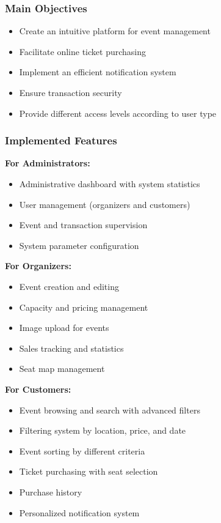 \documentclass[12pt,a4paper]{article}
\begin{document}
\subsubsection{Main Objectives}
\begin{itemize}
    \item Create an intuitive platform for event management
    \item Facilitate online ticket purchasing
    \item Implement an efficient notification system
    \item Ensure transaction security
    \item Provide different access levels according to user type
\end{itemize}

\subsubsection{Implemented Features}

\textbf{For Administrators:}
\begin{itemize}
    \item Administrative dashboard with system statistics
    \item User management (organizers and customers)
    \item Event and transaction supervision
    \item System parameter configuration
\end{itemize}

\textbf{For Organizers:}
\begin{itemize}
    \item Event creation and editing
    \item Capacity and pricing management
    \item Image upload for events
    \item Sales tracking and statistics
    \item Seat map management
\end{itemize}

\textbf{For Customers:}
\begin{itemize}
    \item Event browsing and search with advanced filters
    \item Filtering system by location, price, and date
    \item Event sorting by different criteria
    \item Ticket purchasing with seat selection
    \item Purchase history
    \item Personalized notification system
\end{itemize}
\end{document}
